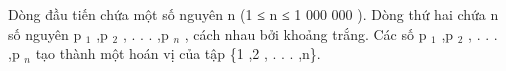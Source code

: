Dòng đầu tiến chứa một số nguyên n (1 ≤ n ≤ 1 000 000 ). Dòng thứ hai chứa n số nguyên p   $_    1   $   ,p   $_    2   $   , . . . ,p   $_    n   $   , cách nhau bởi khoảng trắng. Các số p   $_    1   $   ,p   $_    2   $   , . . . ,p   $_    n   $   tạo thành một hoán vị của tập \{1 ,2 , . . . ,n\}.